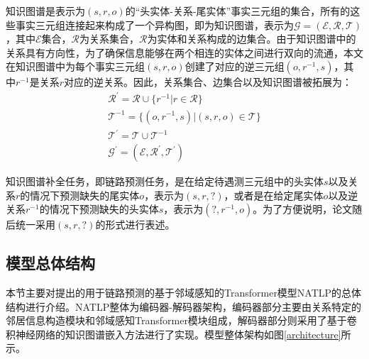 \begin{longtable}[htbp]{cc}
\end{longtable}

知识图谱是表示为$(s,r,o)$的“头实体-关系-尾实体”事实三元组的集合，所有的这些事实三元组连接起来构成了一个异构图，即为知识图谱，表示为$\mathcal{G} = (\mathcal{E}, \mathcal{R}, \mathcal{T})$，其中$\mathcal{E}$集合，$\mathcal{R}$为关系集合，$\mathcal{R}$为实体和关系构成的边集合。由于知识图谱中的关系具有方向性，为了确保信息能够在两个相连的实体之间进行双向的流通，本文在知识图谱中为每个事实三元组$(s,r,o)$创建了对应的逆三元组$(o,r^{-1},s)$，其中$r^{-1}$是关系$r$对应的逆关系。因此，关系集合、边集合以及知识图谱被拓展为：
\begin{gather}
    \mathcal{R}^{\prime}=\mathcal{R}\cup\{ r^{-1} | r\in \mathcal{R}\}\\
    \mathcal{T}^{-1}= \{ (o,r^{-1},s)| (s,r,o)\in \mathcal{T}\}\\
    \mathcal{T}^{\prime} = \mathcal{T}\cup\mathcal{T}^{-1}\\
    \mathcal{G}^\prime = (\mathcal{E}, \mathcal{R}^\prime, \mathcal{T}^\prime)
\end{gather}

知识图谱补全任务，即链路预测任务，是在给定待遇测三元组中的头实体$s$以及关系$r$的情况下预测缺失的尾实体$o$，表示为$(s, r, ?)$，或者是在给定尾实体$o$以及逆关系$r^{-1}$的情况下预测缺失的头实体$s$，表示为$(?, r^{-1} , o) $。为了方便说明，论文随后统一采用$(s, r, ?)$的形式进行表述。


\subsection{模型总体结构}

本节主要对提出的用于链路预测的基于邻域感知的Transformer模型NATLP的总体结构进行介绍。NATLP整体为编码器-解码器架构，编码器部分主要由关系特定的邻居信息构造模块和邻域感知Transformer模块组成，解码器部分则采用了基于卷积神经网络的知识图谱嵌入方法进行了实现。模型整体架构如图\ref{architecture}所示。

